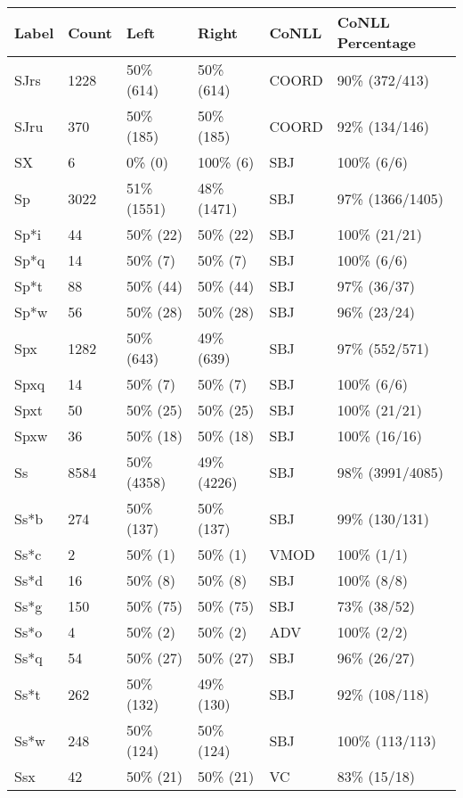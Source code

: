 \begin{figure*}
\begin{tabular}{|l|l|l|l||l|l|}
\hline
Label & Count & Left & Right & CoNLL & CoNLL Percentage\\ 
\hline
 SJrs & 1228 & 50\% (614) & 50\% (614) & COORD & 90\% (372/413) \\ 
\hline
 SJru & 370 & 50\% (185) & 50\% (185) & COORD & 92\% (134/146) \\ 
\hline
 SX & 6 & 0\% (0) & 100\% (6) & SBJ & 100\% (6/6) \\ 
\hline
 Sp & 3022 & 51\% (1551) & 48\% (1471) & SBJ & 97\% (1366/1405) \\ 
\hline
 Sp*i & 44 & 50\% (22) & 50\% (22) & SBJ & 100\% (21/21) \\ 
\hline
 Sp*q & 14 & 50\% (7) & 50\% (7) & SBJ & 100\% (6/6) \\ 
\hline
 Sp*t & 88 & 50\% (44) & 50\% (44) & SBJ & 97\% (36/37) \\ 
\hline
 Sp*w & 56 & 50\% (28) & 50\% (28) & SBJ & 96\% (23/24) \\ 
\hline
 Spx & 1282 & 50\% (643) & 49\% (639) & SBJ & 97\% (552/571) \\ 
\hline
 Spxq & 14 & 50\% (7) & 50\% (7) & SBJ & 100\% (6/6) \\ 
\hline
 Spxt & 50 & 50\% (25) & 50\% (25) & SBJ & 100\% (21/21) \\ 
\hline
 Spxw & 36 & 50\% (18) & 50\% (18) & SBJ & 100\% (16/16) \\ 
\hline
 Ss & 8584 & 50\% (4358) & 49\% (4226) & SBJ & 98\% (3991/4085) \\ 
\hline
 Ss*b & 274 & 50\% (137) & 50\% (137) & SBJ & 99\% (130/131) \\ 
\hline
 Ss*c & 2 & 50\% (1) & 50\% (1) & VMOD & 100\% (1/1) \\ 
\hline
 Ss*d & 16 & 50\% (8) & 50\% (8) & SBJ & 100\% (8/8) \\ 
\hline
 Ss*g & 150 & 50\% (75) & 50\% (75) & SBJ & 73\% (38/52) \\ 
\hline
 Ss*o & 4 & 50\% (2) & 50\% (2) & ADV & 100\% (2/2) \\ 
\hline
 Ss*q & 54 & 50\% (27) & 50\% (27) & SBJ & 96\% (26/27) \\ 
\hline
 Ss*t & 262 & 50\% (132) & 49\% (130) & SBJ & 92\% (108/118) \\ 
\hline
 Ss*w & 248 & 50\% (124) & 50\% (124) & SBJ & 100\% (113/113) \\ 
\hline
 Ssx & 42 & 50\% (21) & 50\% (21) & VC & 83\% (15/18) \\ 

\end{tabular}
\end{figure*}

